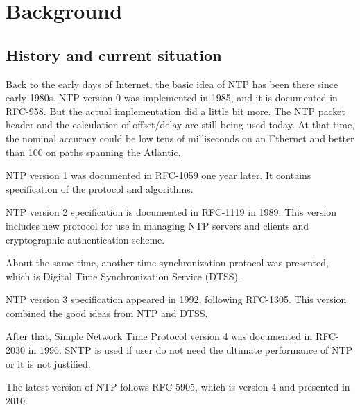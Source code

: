 \chapter{Background}

\section{History and current situation}%
\label{sec:history_and_current_situation}
Back to the early days of Internet, the basic idea of NTP has been there since
early 1980s. NTP version 0 was implemented in 1985, and it is documented in
RFC-958. But the actual implementation did a little bit more. The NTP packet
header and the calculation of offset/delay are still being used today. At that
time, the nominal accuracy could be  low tens of milliseconds on an Ethernet
and better than 100 on paths spanning the Atlantic.

NTP version 1 was documented in RFC-1059 one year later. It contains
specification of the protocol and algorithms.

NTP version 2 specification is documented in RFC-1119 in 1989. This version
includes new protocol for use in managing NTP servers and clients and
cryptographic authentication scheme.

About the same time, another time synchronization protocol was presented, which
is Digital Time Synchronization Service (DTSS).

NTP version 3 specification appeared in 1992, following RFC-1305. This version
combined the good ideas from NTP and DTSS.

After that, Simple Network Time Protocol version 4 was documented in RFC-2030
in 1996. SNTP is used if user do not need the ultimate performance of NTP or
it is not justified.

The latest version of NTP follows RFC-5905, which is version 4 and presented in
2010.

